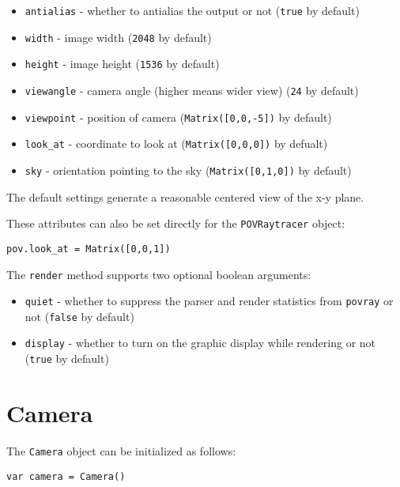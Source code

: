 \begin{itemize}

\item
  \texttt{antialias} - whether to antialias the output or not
  (\texttt{true} by default)
\item
  \texttt{width} - image width (\texttt{2048} by default)
\item
  \texttt{height} - image height (\texttt{1536} by default)
\item
  \texttt{viewangle} - camera angle (higher means wider view)
  (\texttt{24} by default)
\item
  \texttt{viewpoint} - position of camera (\texttt{Matrix({[}0,0,-5{]})}
  by default)
\item
  \texttt{look\_at} - coordinate to look at
  (\texttt{Matrix({[}0,0,0{]})} by defualt)
\item
  \texttt{sky} - orientation pointing to the sky
  (\texttt{Matrix({[}0,1,0{]})} by default)
\end{itemize}

The default settings generate a reasonable centered view of the x-y
plane.

These attributes can also be set directly for the \texttt{POVRaytracer}
object:

\begin{lstlisting}
pov.look_at = Matrix([0,0,1])
\end{lstlisting}

The \texttt{render} method supports two optional boolean arguments:

\begin{itemize}

\item
  \texttt{quiet} - whether to suppress the parser and render statistics
  from \texttt{povray} or not (\texttt{false} by default)
\item
  \texttt{display} - whether to turn on the graphic display while
  rendering or not (\texttt{true} by default)
\end{itemize}

\hypertarget{camera}{%
\section{Camera}\label{camera}}

The \texttt{Camera} object can be initialized as follows:

\begin{lstlisting}
var camera = Camera()
\end{lstlisting}

